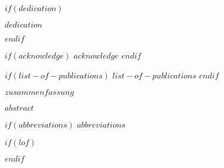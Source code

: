 \documentclass[a4paper,11pt]{article}
\begin{document}
	$if(dedication)$
	\null
	\vspace{5cm}
	\begin{center}
		\textit{$dedication$}
	\end{center}
	\newpage\null\thispagestyle{empty}\newpage
	$endif$
	
	
	$if(acknowledge)$
	\newpage
	$acknowledge$
	$endif$
	\pagestyle{plain}
	\setcounter{page}{1}    %
	\newpage\null\thispagestyle{empty}\newpage
	
	
	$if(list-of-publications)$
	$list-of-publications$
	\newpage\null\thispagestyle{empty}\newpage
	$endif$
	
	
	\begin{justifying}
		
		
		$zusammenfassung$
	
	\end{justifying}
	
	\newpage
	
	\begin{justifying}
	$abstract$
	\end{justifying}
	\newpage
	
	\newpage
	\tableofcontents
	\clearpage
	
	$if(abbreviations)$
	\newpage
	$abbreviations$
	
	$if(lof)$
	\listoffigures
	$endif$
	
\end{document}
